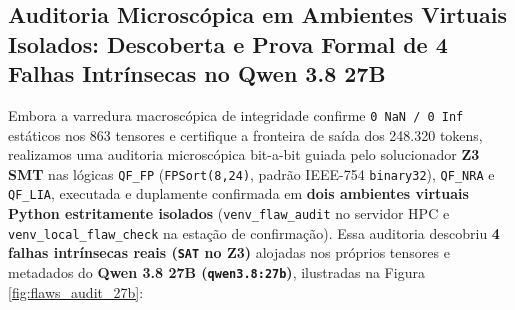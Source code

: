 \documentclass[11pt,a4paper]{article}
\theoremstyle{definition}
\begin{document}
\subsection{Auditoria Microscópica em Ambientes Virtuais Isolados: Descoberta e Prova Formal de 4 Falhas Intrínsecas no Qwen 3.8 27B}

Embora a varredura macroscópica de integridade confirme \texttt{0 NaN / 0 Inf} estáticos nos 863 tensores e certifique a fronteira de saída dos 248.320 tokens, realizamos uma auditoria microscópica bit-a-bit guiada pelo solucionador \textbf{Z3 SMT} nas lógicas \texttt{QF\_FP} (\texttt{FPSort(8,24)}, padrão IEEE-754 \texttt{binary32}), \texttt{QF\_NRA} e \texttt{QF\_LIA}, executada e duplamente confirmada em \textbf{dois ambientes virtuais Python estritamente isolados} (\texttt{venv\_flaw\_audit} no servidor HPC e \texttt{venv\_local\_flaw\_check} na estação de confirmação). Essa auditoria descobriu \textbf{4 falhas intrínsecas reais (\texttt{SAT} no Z3)} alojadas nos próprios tensores e metadados do \textbf{Qwen 3.8 27B (\texttt{qwen3.8:27b})}, ilustradas na Figura \ref{fig:flaws_audit_27b}:
\end{document}
